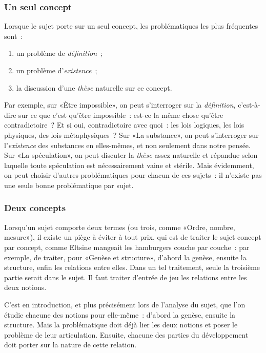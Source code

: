 \documentclass[a4paper,11pt]{article}
\newcommand{\cad}{c'est-à-dire}
\begin{document}
\subsubsection{Un seul concept}

Lorsque le sujet porte sur un seul concept, les problématiques les plus
fréquentes sont~:
\begin{enumerate}
\item un problème de \emph{définition}~;
\item un problème d'\emph{existence}~;
\item la discussion d'une \emph{thèse} naturelle sur ce concept.
\end{enumerate}
Par exemple, sur «Être impossible», on peut s'interroger sur la
\emph{définition}, \cad{} sur ce que c'est qu'être impossible~: est-ce
la même chose qu'être contradictoire~?  Et si oui, contradictoire avec
quoi~: les lois logiques, les lois physiques, des lois métaphysiques~?
Sur «La substance», on peut s'interroger sur l'\emph{existence} des
substances en elles-mêmes, et non seulement dans notre pensée. Sur «La
spéculation», on peut discuter la \emph{thèse} assez naturelle et
répandue selon laquelle toute spéculation est nécessairement vaine et
stérile. Mais évidemment, on peut choisir d'autres problématiques pour
chacun de ces sujets~: il n'existe pas une seule bonne problématique par
sujet.



\subsubsection{Deux concepts}

Lorsqu'un sujet comporte deux termes (ou trois, comme «Ordre, nombre,
mesure»), il existe un piège à éviter à tout prix, qui est de traiter le
sujet concept par concept, comme Eltsine mangeait les hamburgers couche
par couche~: par exemple, de traiter, pour «Genèse et structure»,
d'abord la genèse, ensuite la structure, enfin les relations entre
elles. Dans un tel traitement, seule la troisième partie serait dans le
sujet. Il faut traiter d'entrée de jeu les relations entre les deux
notions.

\par

C'est en introduction, et plus précisément lors de l'analyse du sujet,
que l'on étudie chacune des notions pour elle-même~: d'abord la genèse,
ensuite la structure. Mais la problématique doit déjà lier les deux
notions et poser le problème de leur articulation. Ensuite, chacune des
parties du développement doit porter sur la nature de cette relation.
\end{document}

